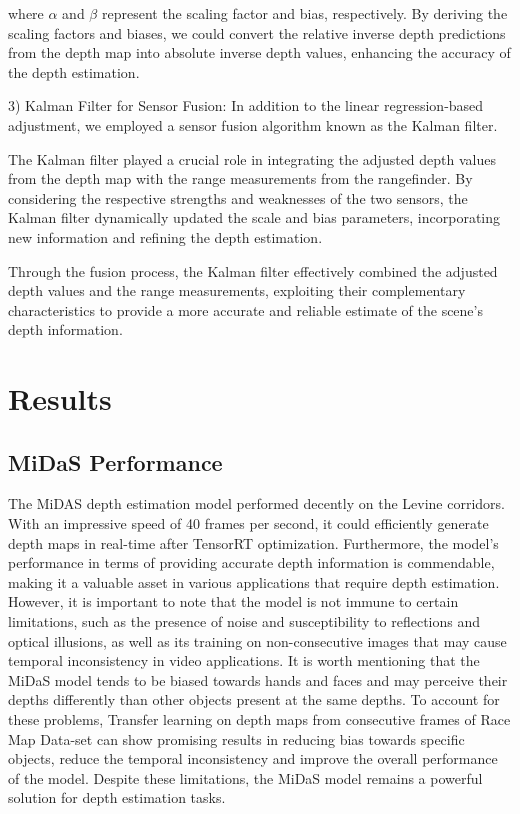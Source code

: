 \documentclass[conference]{IEEEtran}
\begin{document}
where $\alpha$ and $\beta$ represent the scaling factor and bias, respectively. By deriving the scaling factors and biases, we could convert the relative inverse depth predictions from the depth map into absolute inverse depth values, enhancing the accuracy of the depth estimation.

3) Kalman Filter for Sensor Fusion:
In addition to the linear regression-based adjustment, we employed a sensor fusion algorithm known as the Kalman filter. 

The Kalman filter played a crucial role in integrating the adjusted depth values from the depth map with the range measurements from the rangefinder. By considering the respective strengths and weaknesses of the two sensors, the Kalman filter dynamically updated the scale and bias parameters, incorporating new information and refining the depth estimation.

Through the fusion process, the Kalman filter effectively combined the adjusted depth values and the range measurements, exploiting their complementary characteristics to provide a more accurate and reliable estimate of the scene's depth information.


\section{Results}
\subsection{MiDaS Performance}
The MiDAS depth estimation model performed decently on the Levine corridors. With an impressive speed of 40 frames per second, it could efficiently generate depth maps in real-time after TensorRT optimization. Furthermore, the model's performance in terms of providing accurate depth information is commendable, making it a valuable asset in various applications that require depth estimation. However, it is important to note that the model is not immune to certain limitations, such as the presence of noise and susceptibility to reflections and optical illusions, as well as its training on non-consecutive images that may cause temporal inconsistency in video applications. It is worth mentioning that the MiDaS model tends to be biased towards hands and faces and may perceive their depths differently than other objects present at the same depths. To account for these problems, Transfer learning on depth maps from consecutive frames of Race Map Data-set can show promising results in reducing bias towards specific objects, reduce the temporal inconsistency and improve the overall performance of the model.  Despite these limitations, the MiDaS model remains a powerful solution for depth estimation tasks.
\end{document}
